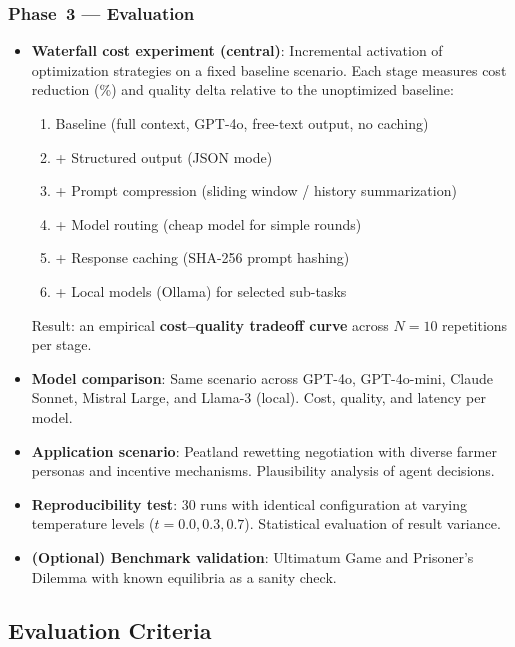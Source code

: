 \documentclass[12pt, a4paper]{article}
\begin{document}
\subsubsection*{Phase~3 --- Evaluation}
\begin{itemize}
    \item \textbf{Waterfall cost experiment (central)}: Incremental activation of optimization strategies on a fixed baseline scenario. Each stage measures cost reduction (\%) and quality delta relative to the unoptimized baseline:
    \begin{enumerate}[label=Stage~\arabic*:, leftmargin=2cm]
        \item Baseline (full context, GPT-4o, free-text output, no caching)
        \item + Structured output (JSON mode)
        \item + Prompt compression (sliding window / history summarization)
        \item + Model routing (cheap model for simple rounds)
        \item + Response caching (SHA-256 prompt hashing)
        \item + Local models (Ollama) for selected sub-tasks
    \end{enumerate}
    Result: an empirical \textbf{cost--quality tradeoff curve} across $N{=}10$ repetitions per stage.
    \item \textbf{Model comparison}: Same scenario across GPT-4o, GPT-4o-mini, Claude Sonnet, Mistral Large, and Llama-3 (local). Cost, quality, and latency per model.
    \item \textbf{Application scenario}: Peatland rewetting negotiation with diverse farmer personas and incentive mechanisms. Plausibility analysis of agent decisions.
    \item \textbf{Reproducibility test}: 30 runs with identical configuration at varying temperature levels ($t{=}0.0, 0.3, 0.7$). Statistical evaluation of result variance.
    \item \textbf{(Optional) Benchmark validation}: Ultimatum Game and Prisoner's Dilemma with known equilibria as a sanity check.
\end{itemize}

\subsection{Evaluation Criteria}
\end{document}
